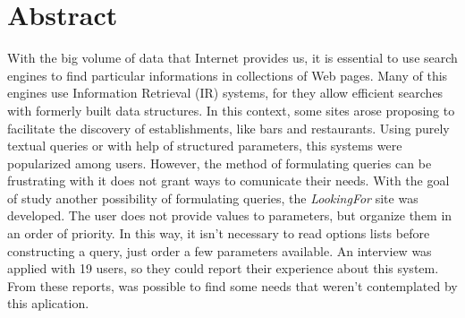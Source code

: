 \documentclass[11pt,oneside,a4paper]{book}
\begin{document}


 \chapter*{Abstract}

With the big volume of data that Internet provides us, it is essential to use search engines to find particular informations in collections of Web pages. Many of this engines use Information Retrieval (IR) systems, for they allow efficient searches with formerly built data structures. In this context, some sites arose proposing to facilitate the discovery of establishments, like bars and restaurants. Using purely textual queries or with help of structured parameters, this systems were popularized among users. However, the method of formulating queries can be frustrating with it does not grant ways to comunicate their needs. With the goal of study another possibility of formulating queries, the \emph{LookingFor} site was developed. The user does not provide values to parameters, but organize them in an order of priority. In this way, it isn’t necessary to read options lists before constructing a query, just order a few parameters available. An interview was applied with 19 users, so they could report their experience about this system. From these reports, was possible to find some needs that weren’t contemplated by this aplication. \\
\end{document}
